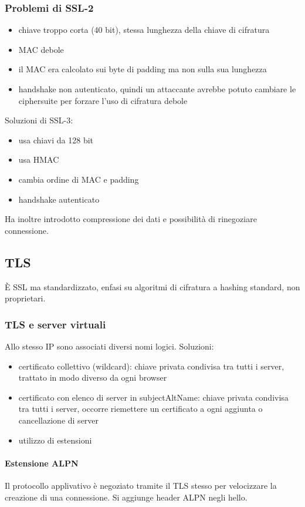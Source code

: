 \documentclass[11pt]{article}
\begin{document}
\subsubsection{Problemi di SSL-2}
\begin{itemize}
    \item chiave troppo corta (40 bit), stessa lunghezza della chiave di cifratura 
    \item MAC debole
    \item il MAC era calcolato sui byte di padding ma non sulla sua lunghezza 
    \item handshake non autenticato, quindi un attaccante avrebbe potuto cambiare le ciphersuite per forzare l'uso di cifratura debole 
\end{itemize}
Soluzioni di SSL-3:
\begin{itemize}
    \item usa chiavi da 128 bit 
    \item usa HMAC 
    \item cambia ordine di MAC e padding 
    \item handshake autenticato 
\end{itemize}
Ha inoltre introdotto compressione dei dati e possibilità di rinegoziare connessione.
\subsection{TLS}
È SSL ma standardizzato, enfasi su algoritmi di cifratura a hashing standard, non proprietari. 
\subsubsection{TLS e server virtuali}
Allo stesso IP sono associati diversi nomi logici. Soluzioni:
\begin{itemize}
    \item certificato collettivo (wildcard): chiave privata condivisa tra tutti i server, trattato in modo diverso da ogni 
    browser
    \item certificato con elenco di server in subjectAltName: chiave privata condivisa tra tutti i server, occorre riemettere 
    un certificato a ogni aggiunta o cancellazione di server 
    \item utilizzo di estensioni 
\end{itemize}
\paragraph*{Estensione ALPN}
Il protocollo applivativo è negoziato tramite il TLS stesso per velocizzare la creazione di una connessione. Si aggiunge 
header ALPN negli hello.
\end{document}
